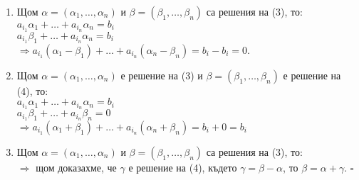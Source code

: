 \documentclass[fleqn,12pt]{article}
\begin{document}
\begin{flushleft}
\begin{enumerate}
    \item Щом $\alpha = (\alpha_1, \dots, \alpha_n)$ и $\beta = (\beta_1, \dots, \beta_n)$ са решения на (3), то:\\
    $a_{i_1} \alpha_1 + \dots + a_{i_n} \alpha_n = b_i$ \\
    $a_{i_1} \beta_1 + \dots + a_{i_n} \alpha_n = b_i$ \\
    $\Rightarrow a_{i_1} (\alpha_1 - \beta_1) + \dots + a_{i_n} (\alpha_n - \beta_n) = b_i - b_i = 0$.
    \item Щом $\alpha = (\alpha_1, \dots, \alpha_n)$ е решение на (3) и $\beta = (\beta_1, \dots, \beta_n)$ е решение на (4), то: \\
    $a_{i_1} \alpha_1 + \dots + a_{i_n} \alpha_n = b_i$ \\
    $a_{i_1} \beta_1 + \dots + a_{i_n} \beta_n = 0$ \\
    $\Rightarrow a_{i_1} (\alpha_1 + \beta_1) + \dots + a_{i_n} (\alpha_n + \beta_n) = b_i + 0 = b_i $
    \item Щом $\alpha = (\alpha_1, \dots, \alpha_n)$ и $\beta = (\beta_1, \dots, \beta_n)$ са решения на (3), то: \\
    $\Rightarrow$ щом доказахме, че $\gamma$ е решение на (4), където $\gamma = \beta - \alpha$, то $\beta = \alpha + \gamma$. $\square$
\end{enumerate}

\end{flushleft}
\end{document}
